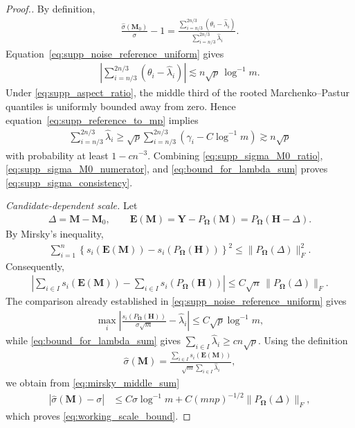\documentclass[numsec,webpdf,modern,large,namedate]{oup-authoring-template}
\theoremstyle{plain}
\theoremstyle{remark}
\newcommand{\M}{\bm{M}}
\newcommand{\bH}{\bm{H}}
\newcommand{\Y}{\bm{Y}}
\newcommand{\bOmega}{\bm{\Omega}}
\newif\ifmarkchanges
\newenvironment{revision}{\begingroup\ifmarkchanges\color{red}\fi}{\endgroup}
\begin{document}
\begin{revision}
\begin{proof}[Proof.]
By definition,
\begin{align}
\label{eq:supp_sigma_M0_ratio}
    \frac{\widehat\sigma(\M_0)}{\sigma}-1
    =\frac{\sum_{i=n/3}^{2n/3}
      (\theta_i-\widehat\lambda_i)}
    {\sum_{i=n/3}^{2n/3}\widehat\lambda_i}.
\end{align}
Equation~\eqref{eq:supp_noise_reference_uniform} gives
\begin{align}
\label{eq:supp_sigma_M0_numerator}
    \left|\sum_{i=n/3}^{2n/3}
      (\theta_i-\widehat\lambda_i)\right|
    \lesssim n\sqrt p\,\log^{-1}m.
\end{align}
Under \eqref{eq:supp_aspect_ratio}, the middle third of the rooted
Marchenko--Pastur quantiles is uniformly bounded away from zero.  Hence
equation~\eqref{eq:supp_reference_to_mp} implies
\begin{align*}
    \sum_{i=n/3}^{2n/3}\widehat\lambda_i
    \ge\sqrt p\sum_{i=n/3}^{2n/3}
      (\gamma_i-C\log^{-1}m)
    \gtrsim n\sqrt p
\end{align*}
with probability at least $1-cn^{-3}$.  Combining
\eqref{eq:supp_sigma_M0_ratio}, \eqref{eq:supp_sigma_M0_numerator}, and \eqref{eq:bound_for_lambda_sum} proves
\eqref{eq:supp_sigma_consistency}.

\textit{Candidate-dependent scale.} Let
\begin{align*}
    \Delta=\M-\M_0,\qquad
    \bm E(\M)=\Y-P_{\bOmega}(\M)
    =P_{\bOmega}(\bH-\Delta).
\end{align*}
By Mirsky's inequality,
\begin{align*}
    \sum_{i=1}^n
    \left\{s_i(\bm E(\M))-s_i(P_{\bOmega}(\bH))\right\}^2
    \le \|P_{\bOmega}(\Delta)\|_F^2.
\end{align*}
Consequently,
\begin{align}
\label{eq:mirsky_middle_sum}
    \left|
    \sum_{i\in I}s_i(\bm E(\M))
    -\sum_{i\in I}s_i(P_{\bOmega}(\bH))
    \right|
    \le C\sqrt n\,\|P_{\bOmega}(\Delta)\|_F.
\end{align}
The comparison already established in \eqref{eq:supp_noise_reference_uniform} gives
\begin{align*}
    \max_i\left|
    \frac{s_i(P_{\bOmega}(\bH))}{\sigma\sqrt m}
    -\widehat\lambda_i
    \right|
    \le C\sqrt p\log^{-1}m,
\end{align*}
while \eqref{eq:bound_for_lambda_sum} gives
$\sum_{i\in I}\widehat\lambda_i\ge cn\sqrt p$.
Using the definition
\begin{align*}
    \widehat\sigma(\M)
    =\frac{\sum_{i\in I}s_i(\bm E(\M))}
    {\sqrt m\sum_{i\in I}\widehat\lambda_i},
\end{align*}
we obtain from \eqref{eq:mirsky_middle_sum}
\begin{align*}
    |\widehat\sigma(\M)-\sigma|
    &\le C\sigma\log^{-1}m
      +C(mnp)^{-1/2}\|P_{\bOmega}(\Delta)\|_F,
\end{align*}
which proves \eqref{eq:working_scale_bound}.


\end{proof}
\end{revision}
\end{document}
